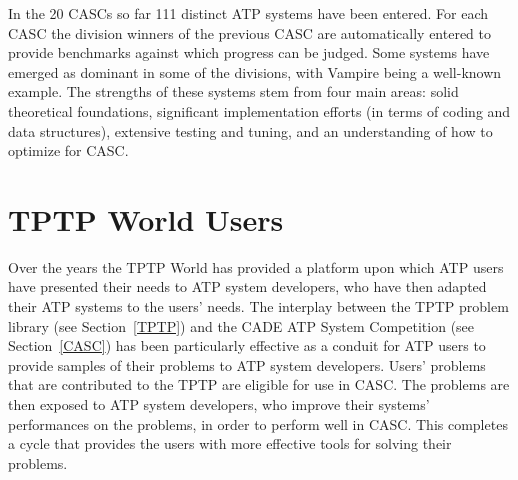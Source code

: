 \documentclass{easychair}
\begin{document}
In the 20 CASCs so far 111 distinct ATP systems have been entered.  
For each CASC the division winners of the previous CASC are automatically entered to provide 
benchmarks against which progress can be judged.
Some systems have emerged as dominant in some of the divisions, with Vampire being a well-known
example.
The strengths of these systems stem from four main areas:
solid theoretical foundations, significant implementation efforts (in terms of coding and data 
structures), extensive testing and tuning, and an understanding of how to optimize for CASC.

\section{TPTP World Users}
\label{Users}

Over the years the TPTP World has provided a platform upon which ATP users have presented their 
needs to ATP system developers, who have then adapted their ATP systems to the users’ needs.
The interplay between the TPTP problem library (see Section~\ref{TPTP}) and the CADE ATP
System Competition (see Section~\ref{CASC}) has been particularly effective as a conduit for 
ATP users to provide samples of their problems to ATP system developers.
Users' problems that are contributed to the TPTP are eligible for use in CASC.
The problems are then exposed to ATP system developers, who improve their systems' performances 
on the problems, in order to perform well in CASC.
This completes a cycle that provides the users with more effective tools for solving their 
problems.
\end{document}
